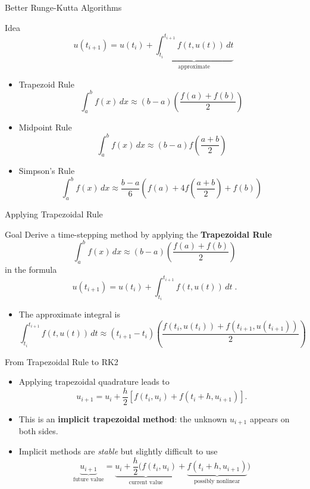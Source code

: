 \documentclass[10pt]{beamer}
\begin{document}

\begin{frame}{Better Runge-Kutta Algorithms}

\begin{block}{Idea}
            $$
            u(t_{i+1}) = u(t_i) + \underbrace{\int_{t_i}^{t_{i+1}} f(t, u(t)) \, dt}_{\text{approximate}}\;
            $$
    
\end{block}


\begin{itemize}
    \item Trapezoid Rule
    $$
    \int_a^b f(x) \,dx \approx (b-a) \left(\frac{f(a)+f(b)}{2}\right)
    $$
    \item Midpoint Rule
    $$
    \int_a^b f(x) \,dx \approx (b-a) f\left(\frac{a+b}{2}\right)
    $$
    \item Simpson's Rule
    $$
    \int_a^b f(x) \,dx \approx \frac{b-a}{6} \left(f(a)+4f\left(\frac{a+b}{2}\right)+f(b)\right)
    $$
\end{itemize}
    
\end{frame}

\begin{frame}{Applying Trapezoidal Rule}

\begin{block}{Goal}
Derive a time-stepping method by applying the \textbf{Trapezoidal Rule}
    $$
    \int_a^b f(x) \,dx \approx (b-a) \left(\frac{f(a)+f(b)}{2}\right)
    $$
in the formula 
                $$
            u(t_{i+1}) = u(t_i) + \int_{t_i}^{t_{i+1}} f(t, u(t)) \, dt\;.
            $$
\end{block}

\begin{itemize}
    \item The approximate integral is 
    $$
    \int_{t_i}^{t_{i+1}} f(t, u(t)) \, dt \approx (t_{i+1}-t_i) \left(\frac{f(t_i,u(t_i))+f(t_{i+1},u(t_{i+1}))}{2}\right)
    $$
\end{itemize}
\end{frame}
\begin{frame}{From Trapezoidal Rule to RK2}
\begin{itemize}
    \item Applying trapezoidal quadrature leads to
    \[
    u_{i+1}=u_i+\frac{h}{2}\left[f(t_i,u_i)+f(t_i+h,u_{i+1})\right].
    \]
    \item This is an \textbf{implicit trapezoidal method}: the unknown $u_{i+1}$ appears on both sides.

    \item Implicit methods are \textit{stable} but slightly difficult to use
    \[
    \underbrace{u_{i+1}}_{\text{future value}}=\underbrace{u_i+\frac{h}{2}(f(t_i,u_i)}_{\text{current value}}+\underbrace{f(t_i+h,u_{i+1})}_{\text{possibly nonlinear}})
    \]
\end{itemize}

\end{frame}
\end{document}
